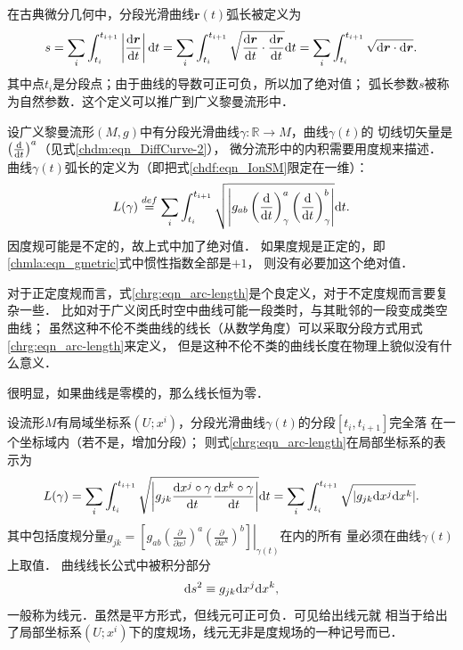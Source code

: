 在古典微分几何中，分段光滑曲线$\boldsymbol{r}(t)$弧长被定义为
\begin{equation*}
    s=\sum_{i} \int_{t_i}^{t_{i+1}} \left|\frac{{\rm d}\boldsymbol{r}}{{\rm d}t}\right| {\rm d} t
    =\sum_{i} \int_{t_i}^{t_{i+1}} \sqrt{\frac{{\rm d}\boldsymbol{r}}{{\rm d}t}\cdot
        \frac{{\rm d}\boldsymbol{r}}{{\rm d}t} } {\rm d} t
    =\sum_{i} \int_{t_i}^{t_{i+1}} \sqrt{{\rm d}\boldsymbol{r}\cdot{\rm d}\boldsymbol{r} }.
\end{equation*}
其中点${t_i}$是分段点；由于曲线的导数可正可负，所以加了绝对值；
弧长参数$s$被称为{\heiti 自然参数}．这个定义可以推广到广义黎曼流形中．


设广义黎曼流形$(M,g)$中有分段光滑曲线$\gamma:\mathbb{R}\to M$，曲线$\gamma(t)$的
切线切矢量是$\left(\frac{{\rm d}  }{{\rm d} t}\right)^a$（见式\eqref{chdm:eqn_DiffCurve-2}），
微分流形中的内积需要用度规来描述．
曲线$\gamma(t)${\heiti 弧长}的定义为（即把式\eqref{chdf:eqn_IonSM}限定在一维）：
\begin{equation}\label{chrg:eqn_arc-length}
    L(\gamma)\overset{def}{=}\sum_{i} \int_{t_i}^{t_{i+1}} \sqrt{\left| g_{ab} \left(\frac{{\rm d}  }
        {{\rm d} t}\right)^a_{\gamma}\left(\frac{{\rm d}  }{{\rm d} t}\right)^b_{\gamma}\right|} {\rm d}t .
\end{equation}
因度规可能是不定的，故上式中加了绝对值．
如果度规是正定的，即\eqref{chmla:eqn_gmetric}式中惯性指数全部是$+1$，
则没有必要加这个绝对值．

对于正定度规而言，式\eqref{chrg:eqn_arc-length}是个良定义，对于不定度规而言要复杂一些．
比如对于广义闵氏时空中曲线可能一段类时，与其毗邻的一段变成类空曲线；
虽然这种不伦不类曲线的线长（从数学角度）可以采取分段方式用式\eqref{chrg:eqn_arc-length}来定义，
但是这种不伦不类的曲线长度在物理上貌似没有什么意义．

很明显，如果曲线是零模的，那么线长恒为零．

设流形$M$有局域坐标系$(U;x^i)$，分段光滑曲线$\gamma(t)$的分段$[t_i,t_{i+1}]$完全落
在一个坐标域内（若不是，增加分段）；
则式\eqref{chrg:eqn_arc-length}在局部坐标系的表示为
\begin{equation}\label{chrg:eqn_arc-length-local}
    L(\gamma)=\sum_{i} \int_{t_i}^{t_{i+1}} \sqrt{\left| g_{jk}
        \frac{{\rm d} x^j\circ\gamma }{{\rm d} t}\frac{{\rm d} x^k\circ\gamma }{{\rm d} t}
        \right|} {\rm d}t
    =\sum_{i} \int_{t_i}^{t_{i+1}} \sqrt{\left| g_{jk} {\rm d} x^j {\rm d} x^k  \right|}  .
\end{equation}  %
其中包括度规分量$g_{jk}= \left.\left[g_{ab}\left(\frac{\partial}{\partial x^j}\right)^a
\left(\frac{\partial}{\partial x^k}\right)^b \right] \right|_{\gamma(t)}$在内的所有
量必须在曲线$\gamma(t)$上取值．
曲线线长公式中被积分部分
\begin{equation}
    {\rm d}s^2 \equiv g_{jk} {\rm d} x^j {\rm d} x^k ,
\end{equation}
一般称为{\heiti 线元}．虽然是平方形式，但线元可正可负．可见给出线元就
相当于给出了局部坐标系$(U;x^i)$下的度规场，线元无非是度规场的一种记号而已．

